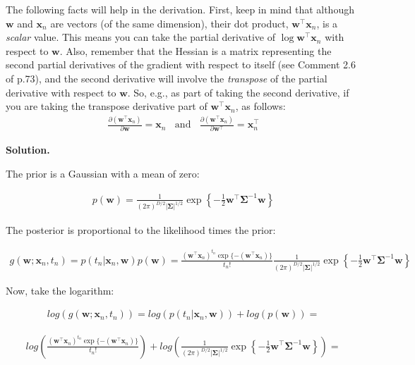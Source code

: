\documentclass[10pt]{article}
\begin{document}
\begin{itemize}
The following facts will help in the derivation.  First, keep in mind that although $\mathbf{w}$ and $\mathbf{x}_n$ are vectors (of the same dimension), their dot product, $\mathbf{w}^\top\mathbf{x}_n$, is a {\em scalar} value.  This means you can take the partial derivative of $\log \mathbf{w}^\top\mathbf{x}_n$ with respect to $\mathbf{w}$.  Also, remember that the Hessian is a matrix representing the second partial derivatives of the gradient with respect to itself (see Comment 2.6 of p.73), and the second derivative will involve the {\em transpose} of the partial derivative with respect to $\mathbf{w}$.  So, e.g., as part of taking the second derivative, if you are taking the transpose derivative part of $\mathbf{w}^\top\mathbf{x}_n$, as follows:
\begin{eqnarray*}
\frac{\partial (\mathbf{w}^\top \mathbf{x}_n)}{\partial \mathbf{w}} = \mathbf{x}_n
~~~~\mathrm{and}~~~~
\frac{\partial (\mathbf{w}^\top \mathbf{x}_n)}{\partial \mathbf{w}^\top} = \mathbf{x}_n^\top
\end{eqnarray*}

{\bf Solution.} %

The prior is a Gaussian with a mean of zero:

\begin{align*}
    p(\mathbf{w}) =
    \frac{1}{(2 \pi)^{D/2} | \mathbf{\Sigma} |^{1/2}} \exp \left\{ -\frac{1}{2} \mathbf{w}^\top \mathbf{\Sigma}^{-1} \mathbf{w} \right\}
\end{align*}


The posterior is proportional to the likelihood times the prior:

\begin{align*}
    g(\mathbf{w};\mathbf{x}_n, t_n) =
    p(t_n | \mathbf{x}_n, \mathbf{w}) p(\mathbf{w}) =
    \frac{(\mathbf{w}^\top\mathbf{x}_n)^{t_n} \exp \{ -(\mathbf{w}^\top\mathbf{x}_n) \}}{t_n!}
    \frac{1}{(2 \pi)^{D/2} | \mathbf{\Sigma} |^{1/2}} \exp \left\{ -\frac{1}{2} \mathbf{w}^\top \mathbf{\Sigma}^{-1} \mathbf{w} \right\}
\end{align*}

Now, take the logarithm:
 
\begin{align*}
    log(g(\mathbf{w};\mathbf{x}_n, t_n)) =
    log(p(t_n | \mathbf{x}_n, \mathbf{w})) + log(p(\mathbf{w})) =
\end{align*}

\begin{align*}
    log(\frac{(\mathbf{w}^\top\mathbf{x}_n)^{t_n} \exp \{ -(\mathbf{w}^\top\mathbf{x}_n) \}}{t_n!}) + log(\frac{1}{(2 \pi)^{D/2} | \mathbf{\Sigma} |^{1/2}} \exp \left\{ -\frac{1}{2} \mathbf{w}^\top \mathbf{\Sigma}^{-1} \mathbf{w} \right\}) =
\end{align*}


\end{itemize}
\end{document}
